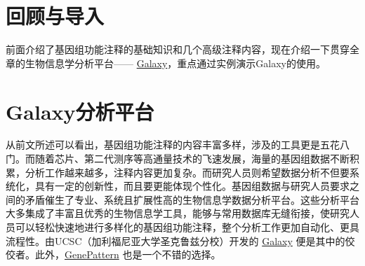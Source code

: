 \documentclass[11pt,a4paper,twoside]{book}
\begin{document}
\section{回顾与导入}
前面介绍了基因组功能注释的基础知识和几个高级注释内容，现在介绍一下贯穿全章的生物信息学分析平台—— \href{http://galaxyproject.org}{Galaxy}，重点通过实例演示Galaxy的使用。

\section{Galaxy分析平台}
从前文所述可以看出，基因组功能注释的内容丰富多样，涉及的工具更是五花八门。而随着芯片、第二代测序等高通量技术的飞速发展，海量的基因组数据不断积累，分析工作越来越多，注释内容更加复杂。而研究人员则希望数据分析不但要系统化，具有一定的创新性，而且要更能体现个性化。基因组数据与研究人员要求之间的矛盾催生了专业、系统且扩展性高的生物信息学数据分析平台。这些分析平台大多集成了丰富且优秀的生物信息学工具，能够与常用数据库无缝衔接，使研究人员可以轻松快速地进行多样化的基因组功能注释，整个分析工作更加自动化、更具流程性。由UCSC（加利福尼亚大学圣克鲁兹分校）开发的 \href{https://main.g2.bx.psu.edu/}{Galaxy} 便是其中的佼佼者。此外，\href{http://www.broadinstitute.org/cancer/software/genepattern/}{GenePattern} 也是一个不错的选择。
\end{document}

